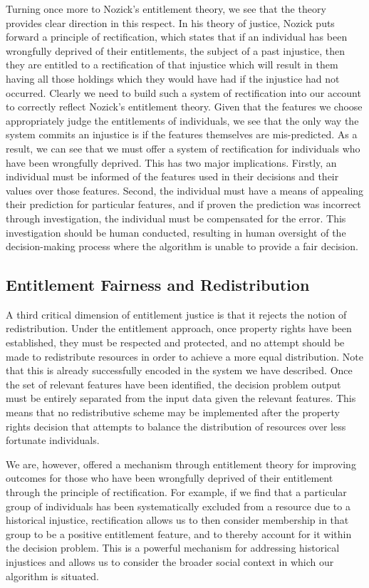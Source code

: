 Turning once more to Nozick's entitlement theory, we see that the theory
provides clear direction in this respect. In his theory of justice, Nozick puts
forward a principle of rectification, which states that if an individual has
been wrongfully deprived of their entitlements, the subject of a past injustice,
then they are entitled to a rectification of that injustice which will result in
them having all those holdings which they would have had if the injustice had
not occurred. Clearly we need to build such a system of rectification into our
account to correctly reflect Nozick's entitlement theory. Given that the
features we choose appropriately judge the entitlements of individuals, we see
that the only way the system commits an injustice is if the features themselves
are mis-predicted. As a result, we can see that we must offer a system of 
rectification for individuals who have been wrongfully deprived. This has two 
major implications. Firstly, an individual must be informed of the features used
in their decisions and their values over those features. Second, the individual
must have a means of appealing their prediction for particular features, and if
proven the prediction was incorrect through investigation, the individual must
be compensated for the error. This investigation should be human conducted,
resulting in human oversight of the decision-making process where the algorithm
is unable to provide a fair decision.

\subsection{Entitlement Fairness and Redistribution}

A third critical dimension of entitlement justice is that it rejects the notion
of redistribution. Under the entitlement approach, once property rights have
been established, they must be respected and protected, and no attempt should be
made to redistribute resources in order to achieve a more equal distribution.
Note that this is already successfully encoded in the system we have described.
Once the set of relevant features have been identified, the decision
problem output must be entirely separated from the input data given the relevant
features. This means that no redistributive scheme may be implemented after the
property rights decision that attempts to balance the distribution of resources
over less fortunate individuals.

We are, however, offered a mechanism through entitlement theory for improving
outcomes for those who have been wrongfully deprived of their entitlement
through the principle of rectification. For example, if we find that a
particular group of individuals has been systematically excluded from a resource
due to a historical injustice, rectification allows us to then consider
membership in that group to be a positive entitlement feature, and to thereby
account for it within the decision problem. This is a powerful mechanism for
addressing historical injustices and allows us to consider the broader social
context in which our algorithm is situated.

